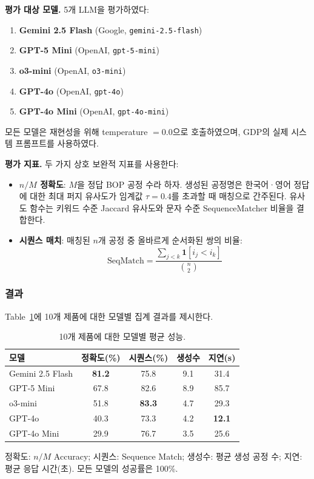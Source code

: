 \textbf{평가 대상 모델.}
5개 LLM을 평가하였다:
\begin{enumerate}
    \item \textbf{Gemini 2.5 Flash} (Google, \texttt{gemini-2.5-flash})
    \item \textbf{GPT-5 Mini} (OpenAI, \texttt{gpt-5-mini})
    \item \textbf{o3-mini} (OpenAI, \texttt{o3-mini})
    \item \textbf{GPT-4o} (OpenAI, \texttt{gpt-4o})
    \item \textbf{GPT-4o Mini} (OpenAI, \texttt{gpt-4o-mini})
\end{enumerate}
모든 모델은 재현성을 위해 temperature $= 0.0$으로 호출하였으며, GDP의 실제 시스템 프롬프트를 사용하였다.

\textbf{평가 지표.}
두 가지 상호 보완적 지표를 사용한다:
\begin{itemize}
    \item \textbf{$n/M$ 정확도}: $M$을 정답 BOP 공정 수라 하자. 생성된 공정명은 한국어·영어 정답에 대한 최대 퍼지 유사도가 임계값 $\tau = 0.4$를 초과할 때 매칭으로 간주된다. 유사도 함수는 키워드 수준 Jaccard 유사도와 문자 수준 SequenceMatcher 비율을 결합한다.

    \item \textbf{시퀀스 매치}: 매칭된 $n$개 공정 중 올바르게 순서화된 쌍의 비율:
    \begin{equation}
        \text{SeqMatch} = \frac{\sum_{j < k} \mathbf{1}[i_j < i_k]}{\binom{n}{2}}
    \end{equation}
\end{itemize}

\subsubsection{결과}

Table~\ref{tab:model_averages}에 10개 제품에 대한 모델별 집계 결과를 제시한다.

\begin{table}[htbp]
\centering
\caption{10개 제품에 대한 모델별 평균 성능.}
\label{tab:model_averages}
\begin{tabular}{lcccc}
\hline
\textbf{모델} & \textbf{정확도(\%)} & \textbf{시퀀스(\%)} & \textbf{생성수} & \textbf{지연(s)} \\
\hline
Gemini 2.5 Flash & \textbf{81.2} & 75.8 & 9.1 & 31.4 \\
GPT-5 Mini       & 67.8 & 82.6 & 8.9 & 85.7 \\
o3-mini           & 51.8 & \textbf{83.3} & 4.7 & 29.3 \\
GPT-4o            & 40.3 & 73.3 & 4.2 & \textbf{12.1} \\
GPT-4o Mini       & 29.9 & 76.7 & 3.5 & 25.6 \\
\hline
\end{tabular}
\begin{tablenotes}
\small
\item 정확도: $n/M$ Accuracy; 시퀀스: Sequence Match; 생성수: 평균 생성 공정 수; 지연: 평균 응답 시간(초). 모든 모델의 성공률은 100\%.
\end{tablenotes}
\end{table}

